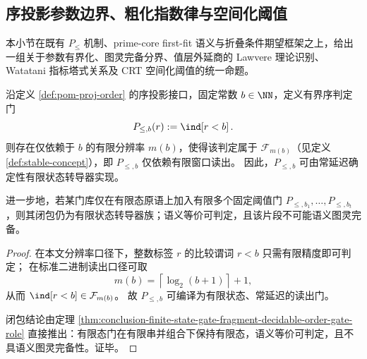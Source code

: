 \subsection{序投影参数边界、粗化指数律与空间化阈值}\label{subsec:conclusion-order-projection-parametric-completeness-watatani-renyi-crt}
本小节在既有 \(P_{\le}\) 机制、prime-core first-fit 语义与折叠条件期望框架之上，给出一组关于参数有界化、图灵完备分界、值层外延商的 Lawvere 理论识别、Watatani 指标塔式关系及 CRT 空间化阈值的统一命题。

\begin{theorem}[有界序投影的有限态塌缩]\label{thm:conclusion-bounded-order-projection-finite-state-collapse}
沿定义 \ref{def:pom-proj-order} 的序投影接口，固定常数 \(b\in\NN\)，定义有界序判定门
\[
P_{\le,b}(r):=\ind\!\left[r<b\right].
\]
则存在仅依赖于 \(b\) 的有限分辨率 \(m(b)\)，使得该判定属于 \(\mathcal F_{m(b)}\)（见定义 \ref{def:stable-concept}），即 \(P_{\le,b}\) 仅依赖有限窗口读出。
因此，\(P_{\le,b}\) 可由常延迟确定性有限状态转导器实现。

进一步地，若某门库仅在有限态原语上加入有限多个固定阈值门 \(P_{\le,b_1},\dots,P_{\le,b_t}\)，则其闭包仍为有限状态转导器族；语义等价可判定，且该片段不可能语义图灵完备。
\end{theorem}
\begin{proof}
在本文分辨率口径下，整数标签 \(r\) 的比较谓词 \(r<b\) 只需有限精度即可判定；
在标准二进制读出口径可取
\[
m(b)=\left\lceil\log_2(b+1)\right\rceil+1,
\]
从而 \(\ind[r<b]\in\mathcal F_{m(b)}\)。
故 \(P_{\le,b}\) 可编译为有限状态、常延迟的读出门。

闭包结论由定理 \ref{thm:conclusion-finite-state-gate-fragment-decidable-order-gate-role} 直接推出：有限态门在有限串并组合下保持有限态，语义等价可判定，且不具语义图灵完备性。证毕。
\end{proof}

